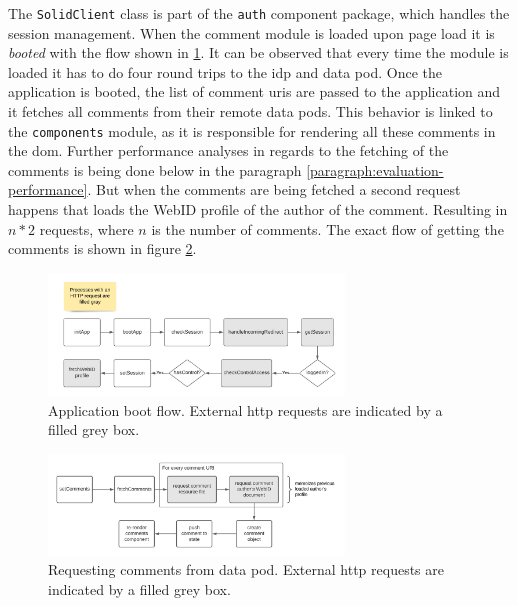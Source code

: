 The \texttt{SolidClient} class is part of the \texttt{auth} component package, which handles the session management. When the comment module is loaded upon page load it is \textit{booted} with the flow shown in \ref{fig:poc-comment-flow-app_boot}. It can be observed that every time the module is loaded it has to do four round trips to the \gls{idp} and data pod. Once the application is booted, the list of comment \glspl{uri} are passed to the application and it fetches all comments from their remote data pods. This behavior is linked to the \texttt{components} module, as it is responsible for rendering all these comments in the \gls{dom}. Further performance analyses in regards to the fetching of the comments is being done below in the paragraph \ref{paragraph:evaluation-performance}. But when the comments are being fetched a second request happens that loads the WebID profile of the author of the comment. Resulting in $n*2$ requests, where $n$ is the number of comments. The exact flow of getting the comments is shown in figure \ref{fig:poc-comment-flow-set_comments}.

\begin{figure}[H]
    \centering
    \includegraphics[width=0.7\textwidth]{prototype/graphs/poc-comment-flow-app_boot.png}
    \caption{Application boot flow. External \gls{http} requests are indicated by a filled grey box.}
    \label{fig:poc-comment-flow-app_boot}
\end{figure}

\begin{figure}[H]
    \centering
    \includegraphics[width=0.7\textwidth]{prototype/graphs/poc-comment-flow-set_comments.png}
    \caption{Requesting comments from data pod. External \gls{http} requests are indicated by a filled grey box.}
    \label{fig:poc-comment-flow-set_comments}
\end{figure}

